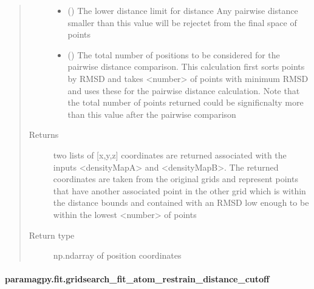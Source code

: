 \documentclass[a4paper,10pt,english,openany,oneside]{sphinxmanual}
\begin{document}
\begin{fulllineitems}
\begin{quote}
\begin{description}
\begin{itemize}
\item {} 
\sphinxAtStartPar
{} () \textendash{} The lower distance limit for distance
Any pairwise distance smaller than this value
will be rejectet from the final space of points

\item {} 
\sphinxAtStartPar
{} () \textendash{} The total number of positions to be considered
for the pairwise distance comparison.
This calculation first sorts points by RMSD
and takes \textless{}number\textgreater{} of points with minimum RMSD
and uses these for the pairwise distance calculation.
Note that the total number of points returned
could be significnalty more than this value after
the pairwise comparison

\end{itemize}

\item[{Returns}] \leavevmode
\sphinxAtStartPar
{} \textendash{} two lists of {[}x,y,z{]} coordinates are returned associated
with the inputs \textless{}densityMapA\textgreater{} and \textless{}densityMapB\textgreater{}.
The returned coordinates are taken from the original grids
and represent points that have another associated point in
the other grid which is within the distance bounds and
contained with an RMSD low enough to be within the lowest
\textless{}number\textgreater{} of points

\item[{Return type}] \leavevmode
\sphinxAtStartPar
np.ndarray of position coordinates

\end{description}\end{quote}

\end{fulllineitems}



\paragraph{paramagpy.fit.gridsearch\_fit\_atom\_restrain\_distance\_cutoff}
\label{\detokenize{reference/generated/paramagpy.fit.gridsearch_fit_atom_restrain_distance_cutoff:paramagpy-fit-gridsearch-fit-atom-restrain-distance-cutoff}}\label{\detokenize{reference/generated/paramagpy.fit.gridsearch_fit_atom_restrain_distance_cutoff::doc}}
\end{document}

